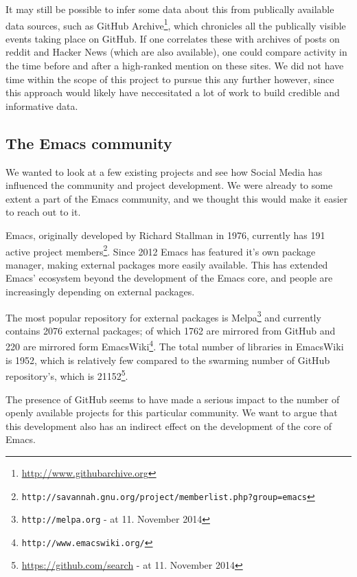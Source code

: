 \documentclass[a4paper,11pt]{article} %
\begin{document}
It may still be possible to infer some data about this from publically
available data sources, such as GitHub
Archive\footnote{\url{http://www.githubarchive.org}}, which chronicles
all the publically visible events taking place on GitHub. If one
correlates these with archives of posts on reddit and Hacker News
(which are also available), one could compare activity in the time
before and after a high-ranked mention on these sites. We did not have
time within the scope of this project to pursue this any further
however, since this approach would likely have neccesitated a lot of
work to build credible and informative data.

\subsection{The Emacs community}

We wanted to look at a few existing projects and see how Social Media has
influenced the community and project development. We were already to some
extent a part of the Emacs community, and we thought this would make it
easier to reach out to it.

Emacs, originally developed by Richard Stallman in 1976, currently has
\num{191} active project
members\footnote{\texttt{http://savannah.gnu.org/project/memberlist.php?group=emacs}}.
Since \num{2012} Emacs has featured it's own package manager, making
external packages more easily available. This has extended Emacs' ecosystem
beyond the development of the Emacs core, and people are increasingly
depending on external packages.

The most popular repository for external packages is
Melpa\footnote{\texttt{http://melpa.org} - at 11. November 2014} and
currently contains \num{2076} external packages; of which \num{1762} are
mirrored from GitHub and \num{220} are mirrored form
EmacsWiki\footnote{\texttt{http://www.emacswiki.org/}}. The total number of
libraries in EmacsWiki is \num{1952}, which is relatively few compared to
the swarming number of GitHub repository's, which is
\num{21152}\footnote{\href{https://github.com/search?utf8=\%E2\%9C\%93\&q=language\%3Aemacs-lisp\&type=Repositories\&ref=searchresults}{https://github.com/search} - at 11. November 2014}.

The presence of GitHub seems to have made a serious impact to the number of
openly available projects for this particular community. We want to argue
that this development also has an indirect effect on the development of the
core of Emacs.
\end{document}
